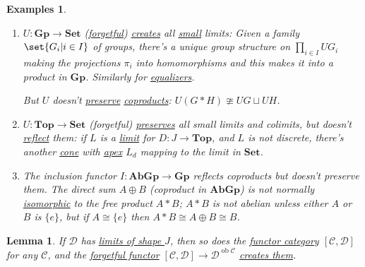 \documentclass{article}
\DeclareMathOperator{\ob}{ob}
\let\to\longrightarrow
\newtheorem{nlemma}[nthm]{Lemma}
\newtheorem{nexample}[nthm]{Examples}
\begin{document}
\begin{nexample}\label{eg:4.6}\leavevmode
  \begin{enumerate}[label=(\alph*)]
    \item $U: \mathbf{Gp} \to \mathbf{Set}$ (\hyperlink{def:forgFunc}{forgetful}) \hyperlink{def:clim}{creates} all \hyperlink{def:small}{small} limits:
      Given a family $\set{G_i | i \in I}$ of groups, there's a unique group structure on $\prod_{i \in I} UG_i$ making the projections $\pi_i$ into homomorphisms and this makes it into a product in $\mathbf{Gp}$.
      Similarly for \hyperlink{def:equalizer}{equalizers}.

      But $U$ doesn't \hyperlink{def:plim}{preserve} \hyperlink{def:lcoprod}{coproducts}: $U(G * H) \ncong UG \sqcup UH$.
    \item $U: \mathbf{Top} \to \mathbf{Set}$ (forgetful) \hyperlink{def:plim}{preserves} all small limits and colimits, but doesn't \hyperlink{def:rlim}{reflect} them: if $L$ is a \hyperlink{def:limit}{limit} for $D: J \to \mathbf{Top}$, and $L$ is not discrete, there's another \hyperlink{def:cone}{cone} with \hyperlink{def:cone}{apex} $L_d$ mapping to the limit in $\mathbf{Set}$.
    \item The inclusion functor $I: \mathbf{AbGp} \to \mathbf{Gp}$ reflects coproducts but doesn't preserve them.
      The direct sum $A \oplus B$ (coproduct in $\mathbf{AbGp}$) is not normally \hyperlink{def:iso}{isomorphic} to the free product $A * B$; $A*B$ is not abelian unless either $A$ or $B$ is $\{e\}$, but if $A \cong \{e\}$ then $A * B \cong A \oplus B \cong B$.
  \end{enumerate}
\end{nexample}
\begin{nlemma}\label{lem:4.7}
  If $\mathscr{D}$ has \hyperlink{def:limit}{limits of shape $J$}, then so does the \hyperlink{def:functcat}{functor category} $[\mathscr{C}, \mathscr{D}]$ for any $\mathscr{C}$, and the \hyperlink{def:forgFunc}{forgetful functor} $[\mathscr{C}, \mathscr{D}] \to \mathscr{D}^{\ob \mathscr{C}}$ \hyperlink{def:clim}{creates them}.
\end{nlemma}
\end{document}
